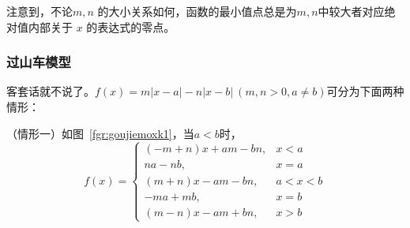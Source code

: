 \documentclass[a4paper,openany]{ctexbook}
\begin{document}
注意到，不论\(m,n\) 的大小关系如何，函数的最小值点总是为\(m,n\)中较大者对应绝对值内部关于 \(x\) 的表达式的零点。

\subsubsection{过山车模型}

客套话就不说了。\(f(x)=m|x-a|-n|x-b|\ (m,n>0,a\ne b)\)可分为下面两种情形：

（情形一）如图~\ref{fgr:goujiemoxk1}，当\(a<b\)时，
\[f(x)=
    \begin{cases}
        (-m+n)x+am-bn, & x<a   \\
        na-nb,         & x=a   \\
        (m+n)x-am-bn,  & a<x<b \\
        -ma+mb,        & x=b   \\
        (m-n)x-am+bn,  & x>b
    \end{cases}
\]
\end{document}
